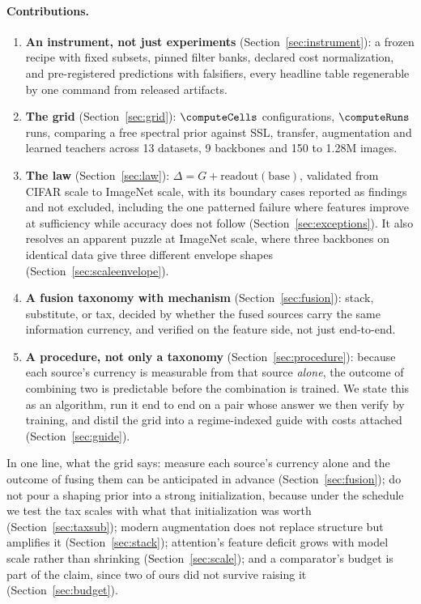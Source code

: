\paragraph{Contributions.}
\begin{enumerate}
  \item \textbf{An instrument, not just experiments} (Section~\ref{sec:instrument}):
    a frozen recipe with fixed subsets, pinned filter banks, declared
    cost normalization, and pre-registered predictions with falsifiers,
    every headline table regenerable by one command from released artifacts.
  \item \textbf{The grid} (Section~\ref{sec:grid}): $\computeCells$ configurations,
  $\computeRuns$ runs,
    comparing a free spectral prior against SSL, transfer, augmentation and
    learned teachers across 13 datasets, 9 backbones and
    150 to 1.28M images.
  \item \textbf{The law} (Section~\ref{sec:law}): $\Delta = G +
    \mathrm{readout}(\mathrm{base})$, validated from CIFAR scale to
    ImageNet scale, with its boundary cases reported as findings and not excluded, including the
    one patterned failure where features improve at sufficiency while accuracy
    does not follow (Section~\ref{sec:exceptions}). It also resolves an
    apparent puzzle at ImageNet scale, where three backbones on identical data
    give three different envelope shapes (Section~\ref{sec:scaleenvelope}).
  \item \textbf{A fusion taxonomy with mechanism}
    (Section~\ref{sec:fusion}): stack, substitute, or tax, decided by
    whether the fused sources carry the same information currency, and
    verified on the feature side, not just end-to-end.
  \item \textbf{A procedure, not only a taxonomy}
    (Section~\ref{sec:procedure}): because each source's currency is
    measurable from that source \emph{alone}, the outcome of combining two
    is predictable before the combination is trained. We state this as an
    algorithm, run it end to end on a pair whose answer we then verify by
    training, and distil the grid into a regime-indexed guide with costs
    attached (Section~\ref{sec:guide}).
\end{enumerate}

In one line, what the grid says: measure each source's currency alone and the
outcome of fusing them can be anticipated in advance
(Section~\ref{sec:fusion}); do not pour a shaping prior into a strong
initialization, because under the schedule we test the tax scales with what
that initialization was worth (Section~\ref{sec:taxsub}); modern augmentation does not replace
structure but amplifies it (Section~\ref{sec:stack}); attention's feature
deficit grows with model scale rather than shrinking
(Section~\ref{sec:scale}); and a comparator's budget is part of the claim,
since two of ours did not survive raising it
(Section~\ref{sec:budget}).

